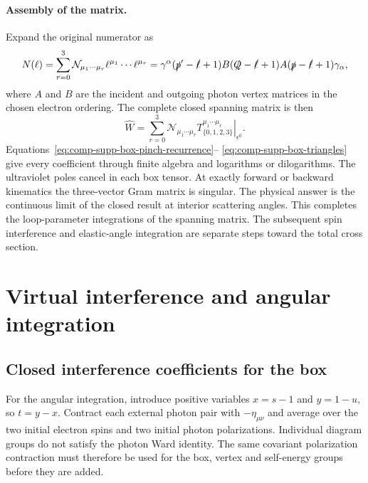 \paragraph{Assembly of the matrix.}
Expand the original numerator as
\begin{equation}
 N(\ell)=\sum_{r=0}^3
   \mathcal N_{\mu_1\cdots\mu_r}
           \ell^{\mu_1}\cdots\ell^{\mu_r}
 =\gamma^\alpha(\slashed p'-\slashed\ell+1)
 B(\slashed Q-\slashed\ell+1)A
 (\slashed p-\slashed\ell+1)\gamma_\alpha,
\end{equation}
where $A$ and $B$ are the incident and outgoing photon vertex
matrices in the chosen electron ordering. The complete closed
spanning matrix is then
\begin{equation}
 \boxed{\widehat W=\sum_{r=0}^3
       \mathcal N_{\mu_1\cdots\mu_r}
       \left.T_{\{0,1,2,3\}}^{\mu_1\cdots\mu_r}
       \right|_{\epsilon^0}.}
 \label{eq:comp-supp-box-closed-matrix}
\end{equation}
Equations~\eqref{eq:comp-supp-box-pinch-recurrence}--
\eqref{eq:comp-supp-box-triangles} give every coefficient through
finite algebra and logarithms or dilogarithms.
The ultraviolet poles cancel in each box tensor.
At exactly forward or backward kinematics the three-vector Gram
matrix is singular. The physical answer is the continuous limit
of the closed result at interior scattering angles.
This completes the loop-parameter integrations of the spanning
matrix. The subsequent spin interference and elastic-angle
integration are separate steps toward the total cross section.

\section{Virtual interference and angular integration}
\subsection{Closed interference coefficients for the box}
\label{sec:comp-supp-box-interference}
For the angular integration, introduce positive variables
$x=s-1$ and $y=1-u$, so $t=y-x$. Contract each external photon
pair with $-\eta_{\mu\nu}$ and average over the two initial electron
spins and two initial photon polarizations. Individual diagram
groups do not satisfy the photon Ward identity. The same covariant
polarization contraction must therefore be used for the box,
vertex and self-energy groups before they are added.

